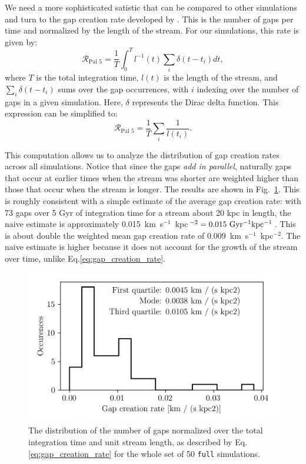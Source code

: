 \documentclass[draft]{aa}
\begin{document}
    We need a more sophisticated satistic that can be compared to other simulations and turn to the gap creation rate developed by \citet{2012ApJ...748...20C}. This is the number of gaps per time and normalized by the length of the stream. For our simulations, this rate is given by: \begin{equation} \label{eq:gap_creation_rate} \mathcal{R}_{\textrm{Pal 5}} =  \frac{1}{T}\int_{0}^T l^{-1}(t) \sum_i \delta(t-t_i) dt,\end{equation}where $T$ is the total integration time, $l(t)$ is the length of the stream, and $\sum_i \delta(t-t_i)$ sums over the gap occurrences, with $i$ indexing over the number of gaps in a given simulation. Here, $\delta$ represents the Dirac delta function. This expression can be simplified to:\begin{equation}\mathcal{R}_{\textrm{Pal 5}} =  \frac{1}{T} \sum_i \frac{1}{l (t_i)}. \end{equation}
    
    This computation allows us to analyze the distribution of gap creation rates across all simulations. Notice that since the gaps \textit{add in parallel}, naturally gaps that occur at earlier times when the stream was shorter are weighted higher than those that occur when the stream is longer. The results are shown in Fig.~\ref{fig:gapcreationrate}. This is roughly consistent with a simple estimate of the average gap creation rate: with 73 gaps over 5 Gyr of integration time for a stream about 20 kpc in length, the naive estimate is approximately 0.015~km~s$^{-1}$~kpc$^{-2} = 0.015~\rm{Gyr^{-1}kpc^{-1}}$. This is about double the weighted mean gap creation rate of 0.009~km~s$^{-1}$~kpc$^{-2}$. The naive estimate is higher because it does not account for the growth of the stream over time, unlike Eq.\ref{eq:gap_creation_rate}.

    \begin{figure}
      \centering
      \includegraphics[width=\linewidth]{gap_creation_rate.png}
      \caption{The distribution of the number of gaps normalized over the total integration time and unit stream length, as described by Eq.\ref{eq:gap_creation_rate} for the whole set of 50 \texttt{full} simulations. }
      \label{fig:gapcreationrate}
    \end{figure}
\end{document}
